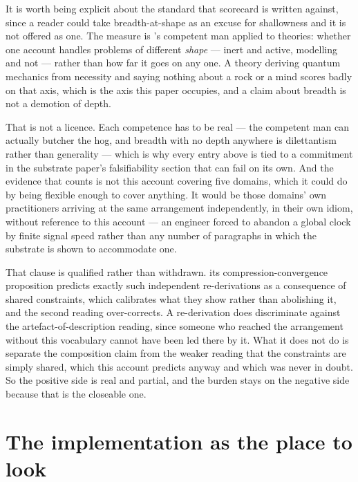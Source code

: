 \documentclass[11pt,a4paper]{article}
\theoremstyle{remark}\newtheorem{remark}[definition]{Remark}
\begin{document}
It is worth being explicit about the standard that scorecard is written against, since a reader could
take breadth-at-shape as an excuse for shallowness and it is not offered as one. The measure is \citeauthor{heinlein1973}'s
competent man \citep{heinlein1973} applied to theories: whether one account handles problems of different \emph{shape}
--- inert and active, modelling and not --- rather than how far it goes on any one. A theory deriving
quantum mechanics from necessity and saying nothing about a rock or a mind scores badly on that axis,
which is the axis this paper occupies, and a claim about breadth is not a demotion of depth.

That is not a licence. Each competence has to be real --- the competent man can
actually butcher the hog, and breadth with no depth anywhere is dilettantism rather than generality
--- which is why every entry above is tied to a commitment in the substrate paper's falsifiability section that
can fail on its own. And the evidence that counts is not this account covering five domains, which it
could do by being flexible enough to cover anything. It would be those domains' own practitioners arriving
at the same arrangement independently, in their own idiom, without reference to this account --- an
engineer forced to abandon a global clock by finite signal speed rather than any number of paragraphs
in which the substrate is shown to accommodate one.

That clause is qualified rather than withdrawn. its compression-convergence proposition predicts exactly such
independent re-derivations as a consequence of shared constraints, which calibrates what they show
rather than abolishing it, and the second reading over-corrects. A re-derivation does discriminate against the artefact-of-description reading, since someone who reached
the arrangement without this vocabulary cannot have been led there by it. What it does not do is
separate the composition claim from the weaker reading that the constraints are simply shared, which
this account predicts anyway and which was never in doubt. So the positive side is real and partial,
and the burden stays on the negative side because that is the closeable one.

\section{The implementation as the place to look}\label{sec:implementation}
\end{document}
